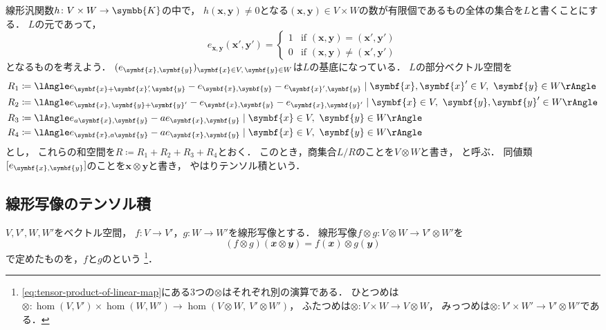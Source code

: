 \documentclass[../sotsu.tex]{subfiles}
\begin{document}
\begin{definition}
    \label{dfn:tensor-product}
    線形汎関数$h \colon V \times W \to \symbb{K}$の中で，
    $h(\symbf{x}, \symbf{y}) \neq 0$となる$(\symbf{x}, \symbf{y}) \in V \times W$の数が有限個であるもの全体の集合を$L$と書くことにする．
    $L$の元であって，
    \begin{equation*}
        e_{\symbf{x}, \symbf{y}} (\symbf{x}', \symbf{y}') = 
        \begin{cases}
            1  &  \text{if } (\symbf{x}, \symbf{y}) = (\symbf{x}', \symbf{y}')  \\
            0  &  \text{if } (\symbf{x}, \symbf{y}) \neq (\symbf{x}', \symbf{y}')
        \end{cases}
    \end{equation*}
    となるものを考えよう．
    $\sequ{e_{\symbf{x}, \symbf{y}}}[\symbf{x} \in V, \, \symbf{y} \in W]$は$L$の基底になっている．
    $L$の部分ベクトル空間を
    \begin{align*}
        R_1 &\coloneq \spanning{ e_{\symbf{x} + \symbf{x}^{\mathrlap{\prime}}, \, \symbf{y}} - e_{\symbf{x}, \symbf{y}} - e_{\symbf{x}', \symbf{y}} \mid \symbf{x}, \symbf{x}' \in V, \  \symbf{y} \in W }  \\
        R_2 &\coloneq \spanning{ e_{\symbf{x}, \, \symbf{y} + \symbf{y}'} - e_{\symbf{x}, \symbf{y}} - e_{\symbf{x}, \symbf{y}'} \mid \symbf{x} \in V, \  \symbf{y}, \symbf{y}' \in W }  \\
        R_3 &\coloneq \spanning{ e_{a\symbf{x}, \symbf{y}} - a e_{\symbf{x}, \symbf{y}} \mid \symbf{x} \in V, \  \symbf{y} \in W }  \\
        R_4 &\coloneq \spanning{ e_{\symbf{x}, a\symbf{y}} - a e_{\symbf{x}, \symbf{y}} \mid \symbf{x} \in V, \  \symbf{y} \in W }
    \end{align*}
    とし，
    これらの和空間を$R \coloneq R_1 + R_2 + R_3 + R_4$とおく．
    このとき，商集合$L/R$のことを$V \otimes W$と書き，
    と呼ぶ．
    同値類$\eqclass{e_{\symbf{x}, \symbf{y}}}$のことを$\symbf{x} \otimes \symbf{y}$と書き，
    やはりテンソル積という．
\end{definition}


\subsection{線形写像のテンソル積}
\label{sec:tensor-product-of-linear-map}

$V, V', W, W'$をベクトル空間，
$f \colon V \to V'$，$g \colon W \to W'$を線形写像とする．
線形写像$f \otimes g \colon V \otimes W \to V' \otimes W'$を
\begin{equation}
    \label{eq:tensor-product-of-linear-map}
    (f \otimes g)(𝒙 \otimes 𝒚)
        = f(𝒙) \otimes g(𝒚)
\end{equation}
で定めたものを，$f$と$g$のという%
\footnote{
    \cref{eq:tensor-product-of-linear-map}にある3つの$\otimes$はそれぞれ別の演算である．
    ひとつめは$\otimes \colon \hom(V, V') \times \hom(W, W') \to \hom ( V \otimes W, \  V' \otimes W' )$，
    ふたつめは$\otimes \colon V \times W \to V \otimes W$，
    みっつめは$\otimes \colon V' \times W' \to V' \otimes W'$である．
}．
\end{document}
